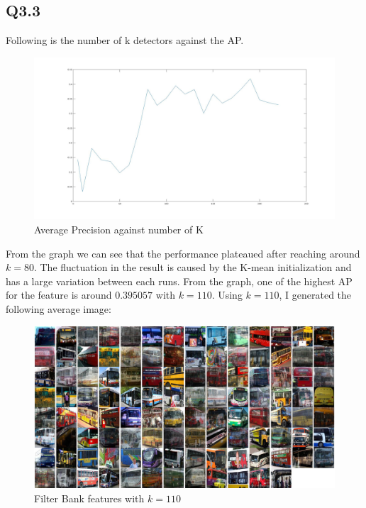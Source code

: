 \documentclass{article}
\begin{document}
\subsection*{Q3.3}
Following is the number of k detectors against the AP.
\begin{figure}[H]
    \centering
    \includegraphics[width=6.5in]{./figures/q34_plot.jpg}
    \caption{Average Precision against number of K}
\end{figure}
From the graph we can see that the performance plateaued after reaching around $k=80$. The fluctuation in the result is caused by the K-mean initialization and has a large variation between each runs. From the graph, one of the highest AP for the feature is around $0.395057$ with $k=110$. Using $k=110$, I generated the following average image:
\begin{figure}[H]
    \centering
    \includegraphics[width=6.5in]{./figures/q34_graph.jpg}
    \caption{Filter Bank features with $k=110$}
\end{figure}
\end{document}
